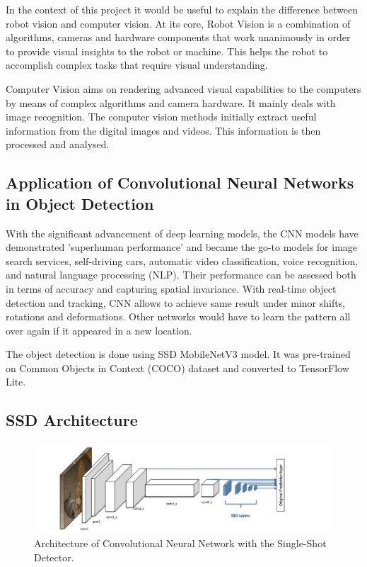 \documentclass[runningheads]{llncs}
\begin{document}
In the context of this project it would be useful to explain the difference between robot vision and computer vision. At its core, Robot Vision is a combination of algorithms, cameras and hardware components that work unanimously in order to provide visual insights to the robot or machine. This helps the robot to accomplish complex tasks that require visual understanding.

Computer Vision aims on rendering advanced visual capabilities to the computers by means of complex algorithms and camera hardware. It mainly deals with image recognition. The computer vision methods initially extract useful information from the digital images and videos. This information is then processed and analysed.\cite {ref_url1} 

\subsection{Application of Convolutional Neural Networks in Object Detection} 

With the significant advancement of deep learning models, the CNN models have demonstrated 'superhuman performance'\cite{ref_book} and became the go-to models for image search services, self-driving cars, automatic video classification, voice recognition, and natural language processing (NLP). Their performance can be assessed both in terms of accuracy and capturing spatial invariance. With real-time object detection and tracking, CNN allows to achieve same result under minor shifts, rotations and deformations. Other networks would have to learn the pattern all over again if it appeared in a new location.\cite {ref_article1}  		

The object detection is done using SSD MobileNetV3 model. It was pre-trained on Common Objects in Context (COCO) dataset and converted to TensorFlow Lite.

\subsection{SSD Architecture} 

\begin{figure}[hbt!]
\includegraphics[width=\textwidth]{SSD_Mobilenet.png}
\caption{Architecture of Convolutional Neural Network with the Single-Shot Detector.} \label{fig1}
\end{figure}
\end{document}

